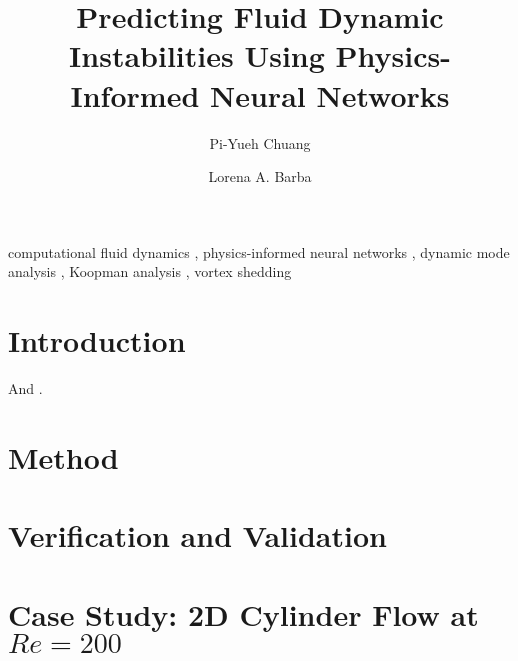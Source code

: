 \documentclass[5p, twocolumn, times, sort&compress]{elsarticle}
\begin{document}
    \begin{frontmatter}
        \title{%
            Predicting Fluid Dynamic Instabilities Using Physics-Informed Neural Networks%
        }

        \author[1]{Pi-Yueh Chuang}
        \author[1]{Lorena A. Barba}

        \begin{abstract}
            \lipsum[1]%
        \end{abstract}

        \begin{keyword}
            computational fluid dynamics \sep
            physics-informed neural networks \sep
            dynamic mode analysis \sep
            Koopman analysis \sep
            vortex shedding
        \end{keyword}
    \end{frontmatter}

    \section{Introduction}
    \lipsum[1-5] And \cite{chen_variants_2012, rowley_spectral_2009, rahaman_spectral_2019}.

    \section{Method}
    

    \section{Verification and Validation}
    
    

    \section{Case Study: 2D Cylinder Flow at $Re=\num{200}$}\label{sec:case-study}
    
\end{document}
